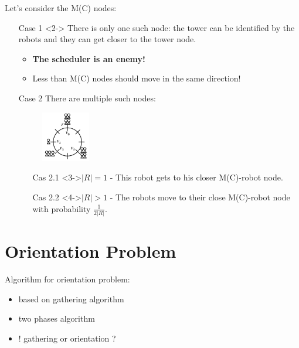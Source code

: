 \documentclass{beamer}
\begin{document}
\begin{frame}

	Let's consider the M(C) nodes:
	\begin{itemize}
		\item[Case 1]<2-> There is only one such node: the tower can be identified by the robots and they can get closer to the tower node.
		\begin{itemize}
			\item<3-> \textbf{The scheduler is an enemy!}
			\item<3-> Less than M(C) nodes should move in the same direction! 
		\end{itemize}
	\end{itemize}

\end{frame}

\begin{frame}
	\begin{itemize}
		\item[Case 2] There are multiple such nodes:
			\begin{figure}[h]
   				\includegraphics[width=0.2\textwidth]{images/random_configuration.png}
			\end{figure}
			\begin{itemize}
				\item[Cas 2.1]<3->$|R| = 1$ - This robot gets to his closer M(C)-robot node. 
				\item[Cas 2.2]<4->$|R| > 1$ - The robots move to their close M(C)-robot node with probability $\frac{1}{2|R|}$.
			\end{itemize}
	\end{itemize}
\end{frame}





\section{Orientation Problem}
\begin{frame}
	Algorithm for orientation problem:
	\begin{itemize}
		\item based on gathering algorithm
		\pause
		\item two phases algorithm
		\pause
		\item ! gathering or orientation ?
	\end{itemize}
\end{frame}
\end{document}
